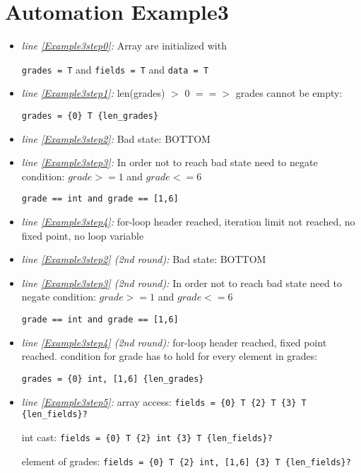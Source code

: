 \documentclass[11pt]{article}
\begin{document}
\section{Automation Example3}

\begin{itemize}

\item \textit{line \ref{Example3step0}:} Array are initialized with 

\verb|grades = T| and \verb|fields = T| and \verb|data = T|

\item \textit{line \ref{Example3step1}:} len(grades) $>$ 0 $==>$ grades cannot be empty:

\verb|grades = {0} T {len_grades}|

\item \textit{line \ref{Example3step2}:} Bad state: BOTTOM

\item \textit{line \ref{Example3step3}:} In order not to reach bad state need to negate condition: $grade >= 1$ and $grade <= 6$

\verb|grade == int and grade == [1,6]|

\item \textit{line \ref{Example3step4}:} for-loop header reached, iteration limit not reached, no fixed point, no loop variable

\item \textit{line \ref{Example3step2} (2nd round):} Bad state: BOTTOM

\item \textit{line \ref{Example3step3} (2nd round):} In order not to reach bad state need to negate condition: $grade >= 1$ and $grade <= 6$

\verb|grade == int and grade == [1,6]|

\item \textit{line \ref{Example3step4} (2nd round):} for-loop header reached, fixed point reached. condition for grade has to hold for every element in grades:

\verb|grades = {0} int, [1,6] {len_grades}|

\item \textit{line \ref{Example3step5}:} array access: \verb|fields = {0} T {2} T {3} T {len_fields}?|

int cast: \verb|fields = {0} T {2} int {3} T {len_fields}?|

element of grades: \verb|fields = {0} T {2} int, [1,6] {3} T {len_fields}?|


\end{itemize}
\end{document}
